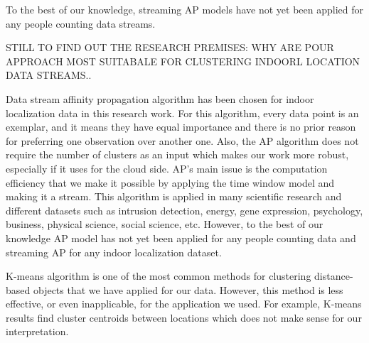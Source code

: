 \documentclass[../UNBThesis2.tex]{subfiles}
\begin{document}
To the best of our knowledge, streaming AP models have not yet been applied for any people counting data streams.  

 STILL TO FIND OUT THE RESEARCH PREMISES: WHY ARE POUR APPROACH MOST SUITABALE FOR CLUSTERING INDOORL LOCATION DATA STREAMS..


Data stream affinity propagation algorithm has been chosen for indoor localization data in this research work. For this algorithm, every data point is an exemplar, and it means they have equal importance and there is no prior reason for preferring one observation over another one. Also, the AP algorithm does not require the number of clusters as an input which makes our work more robust, especially if it uses for the cloud side. AP's main issue is the computation efficiency that we make it possible by applying the time window model and making it a stream. This algorithm is applied in many scientific research and different datasets such as intrusion detection, energy, gene expression, psychology, business, physical science, social science, etc. However, to the best of our knowledge AP model has not yet been applied for any people counting data and streaming AP for any indoor localization dataset.

K-means algorithm is one of the most common methods for clustering distance-based objects that we have applied for our data. However, this method is less effective, or even inapplicable, for the application we used. For example, K-means results find cluster centroids between locations which does not make sense for our interpretation. 


\end{document}
